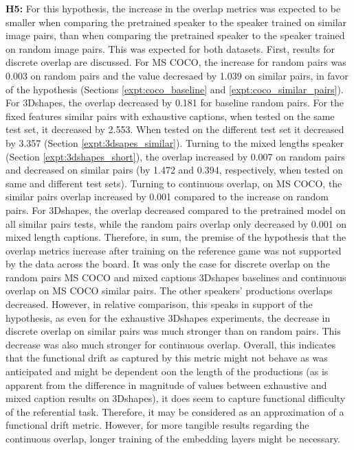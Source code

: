 \textbf{H5:} For this hypothesis, the increase in the overlap metrics was expected to be smaller when comparing the pretrained speaker to the speaker trained on similar image pairs, than when comparing the pretrained speaker to the speaker trained on random image pairs. This was expected for both datasets. First, results for discrete overlap are discussed. 
For MS COCO, the increase for random pairs was 0.003 on random pairs and the value decresaed by 1.039 on similar pairs, in favor of the hypothesis (Sections \ref{expt:coco_baseline} and \ref{expt:coco_similar_pairs}). 
For 3Dshapes, the overlap decreased by 0.181 for baseline random pairs. For the fixed features similar pairs with exhaustive captions, when tested on the same test set, it decreased by 2.553. When tested on the different test set it decreased by 3.357 (Section \ref{expt:3dsapes_similar}). Turning to the mixed lengths speaker (Section \ref{expt:3dshapes_short}), the overlap increased by 0.007 on random pairs and decreased on similar pairs (by 1.472 and 0.394, respectively, when tested on same and different test sets). 
Turning to continuous overlap, on MS COCO, the similar pairs overlap increased by 0.001 compared to the increase on random pairs. For 3Dshapes, the overlap decreased compared to the pretrained model on all similar pairs tests, while the random pairs overlap only decreased by 0.001 on mixed length captions.
Therefore, in sum, the premise of the hypothesis that the overlap metrics increase after training on the reference game was not supported by the data across the board. It was only the case for discrete overlap on the random pairs MS COCO and mixed captions 3Dshapes baselines and continuous overlap on MS COCO similar pairs. The other speakers' productions overlaps decreased. However, in relative comparison, this speaks in support of the hypothesis, as even for the exhaustive 3Dshapes experiments, the decrease in discrete overlap on similar pairs was much stronger than on random pairs. This decrease was also much stronger for continuous overlap. Overall, this indicates that the functional drift as captured by this metric might not behave as was anticipated and might be dependent oon the length of the productions (as is apparent from the difference in magnitude of values between exhaustive and mixed caption results on 3Dshapes), it does seem to capture functional difficulty of the referential task. Therefore, it may be considered as an approximation of a functional drift metric. However, for more tangible results regarding the continuous overlap, longer training of the embedding layers might be necessary. \newline
